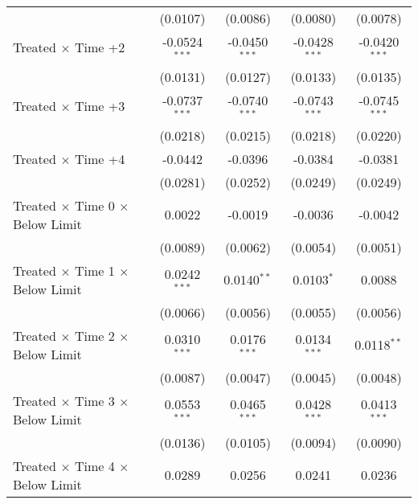 \begin{tabular*}{0.8\textwidth}{@{\extracolsep{\fill}}lcccc}
                                                       & (0.0107)        & (0.0086)        & (0.0080)        & (0.0078)\\   
    Treated $\times$ Time +2                            & -0.0524$^{***}$ & -0.0450$^{***}$ & -0.0428$^{***}$ & -0.0420$^{***}$\\   
                                                       & (0.0131)        & (0.0127)        & (0.0133)        & (0.0135)\\   
    Treated $\times$ Time +3                            & -0.0737$^{***}$ & -0.0740$^{***}$ & -0.0743$^{***}$ & -0.0745$^{***}$\\   
                                                       & (0.0218)        & (0.0215)        & (0.0218)        & (0.0220)\\   
    Treated $\times$ Time +4                            & -0.0442         & -0.0396         & -0.0384         & -0.0381\\   
                                                       & (0.0281)        & (0.0252)        & (0.0249)        & (0.0249)\\   
   Treated $\times$ Time 0 $\times$ Below Limit      & 0.0022          & -0.0019         & -0.0036         & -0.0042\\   
                                                       & (0.0089)        & (0.0062)        & (0.0054)        & (0.0051)\\   
   Treated $\times$ Time 1 $\times$ Below Limit      & 0.0242$^{***}$  & 0.0140$^{**}$   & 0.0103$^{*}$    & 0.0088\\   
                                                       & (0.0066)        & (0.0056)        & (0.0055)        & (0.0056)\\   
   Treated $\times$ Time 2 $\times$ Below Limit      & 0.0310$^{***}$  & 0.0176$^{***}$  & 0.0134$^{***}$  & 0.0118$^{**}$\\   
                                                       & (0.0087)        & (0.0047)        & (0.0045)        & (0.0048)\\   
   Treated $\times$ Time 3 $\times$ Below Limit      & 0.0553$^{***}$  & 0.0465$^{***}$  & 0.0428$^{***}$  & 0.0413$^{***}$\\   
                                                       & (0.0136)        & (0.0105)        & (0.0094)        & (0.0090)\\   
   Treated $\times$ Time 4 $\times$ Below Limit      & 0.0289          & 0.0256          & 0.0241          & 0.0236\\   

\end{tabular*}
